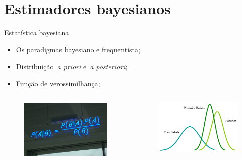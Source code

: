 \section*{Estimadores bayesianos}
\begin{frame}{Estatística bayesiana}
 \begin{itemize}
  \item Os paradigmas bayesiano e frequentista; 
  \item Distribuição~\textit{a priori} e~\textit{a posteriori};
  \item Função de verossimilhança;
  \end{itemize}  
  \begin{columns}
    \begin{column}{0.5\textwidth}
        \begin{figure}[!ht]
        \label{fig:bayes_sign}
        \begin{center}
        \includegraphics[scale=0.07]{figures/Bayes_Theorem_MMB_01.jpg} 
        \end{center}
        \end{figure}        
    \end{column}
\begin{column}{0.5\textwidth}
   \begin{figure}[!ht]
    \label{fig:bayes_graph}
    \begin{center}
    \includegraphics[scale=1.0]{figures/bayesian_inference.jpg} 

\end{center}
\end{figure}
\end{column}
\end{columns}
\end{frame}
